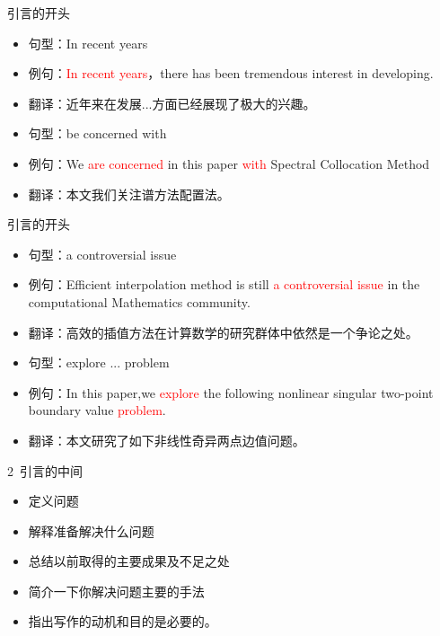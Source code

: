 \documentclass[13pt]{ctexbeamer}
\newcommand{\red}[1]{\textcolor{red}{#1}}
\begin{document}
\begin{frame}{引言的开头}

    \begin{itemize}
        \item 句型：In recent years
        \item 例句：\red{In recent years}，there has been tremendous interest in developing.
        \item 翻译：近年来在发展...方面已经展现了极大的兴趣。
        \newline
        \item 句型：be concerned with
        \item 例句：We \red{are concerned} in this paper \red{with}  Spectral Collocation Method
        \item 翻译：本文我们关注谱方法配置法。

    \end{itemize}
\end{frame}

\begin{frame}{引言的开头}

    \begin{itemize}
        \item 句型：a controversial issue
        \item 例句：Efficient interpolation method is still  \red{a controversial issue} in the computational Mathematics community.
        \item 翻译：高效的插值方法在计算数学的研究群体中依然是一个争论之处。
        \newline
        \item 句型：explore ... problem
        \item 例句：In this paper,we \red{explore} the following nonlinear singular two-point boundary value \red{problem}.
        \item 翻译：本文研究了如下非线性奇异两点边值问题。
    \end{itemize}
\end{frame}


\begin{frame}{2~引言的中间}
	\begin{itemize}

		\item 定义问题

		\item 解释准备解决什么问题
		\item 总结以前取得的主要成果及不足之处
		\item 简介一下你解决问题主要的手法
		\item 指出写作的动机和目的是必要的。
	\end{itemize}
\end{frame}
\end{document}
